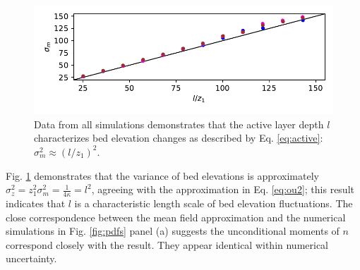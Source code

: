 \begin{figure}
	\centerline{\includegraphics{./figures/ch3/newvariance.pdf}}
	\caption{Data from all simulations demonstrates that the active layer depth $l$ characterizes bed elevation changes as described by Eq. \ref{eq:active}: $\sigma_m^2 \approx (l/z_1)^2$.}
	\label{fig:var}
\end{figure}

Fig. \ref{fig:var} demonstrates that the variance of bed elevations is approximately $\sigma_z^2 = z_1^2 \sigma_m^2 = \frac{1}{4\kappa}=l^2$, agreeing with the approximation in Eq. \ref{eq:ou2}; this result indicates that $l$ is a characteristic length scale of bed elevation fluctuations.
The close correspondence between the mean field approximation and the numerical simulations in Fig. \ref{fig:pdfs} panel (a) suggests the unconditional moments of $n$ correspond closely with the \citet{Ancey2008} result. They appear identical within numerical uncertainty.

